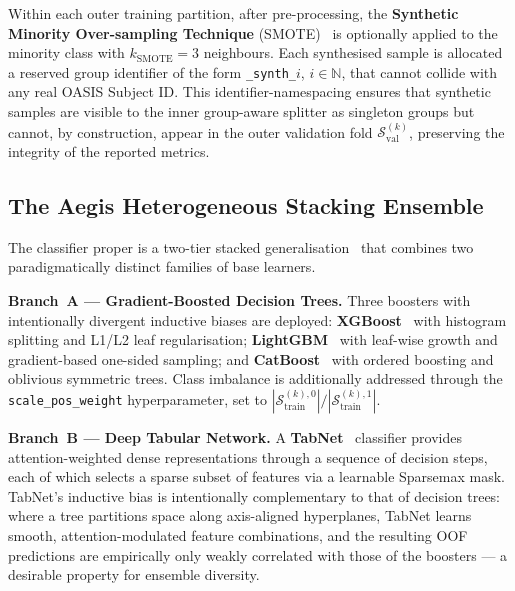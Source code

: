 Within each outer training partition, after pre-processing, the \textbf{Synthetic Minority Over-sampling Technique} (SMOTE)~\cite{chawla2002smote} is optionally applied to the minority class with $k_{\mathrm{SMOTE}} = 3$ neighbours. Each synthesised sample is allocated a reserved group identifier of the form \texttt{\_synth\_$i$}, $i \in \mathbb{N}$, that cannot collide with any real OASIS Subject ID. This identifier-namespacing ensures that synthetic samples are visible to the inner group-aware splitter as singleton groups but cannot, by construction, appear in the outer validation fold $\mathcal{S}_\mathrm{val}^{(k)}$, preserving the integrity of the reported metrics.

\subsection{The Aegis Heterogeneous Stacking Ensemble}
\label{subsec:ensemble}

The classifier proper is a two-tier stacked generalisation~\cite{wolpert1992} that combines two paradigmatically distinct families of base learners.

\textbf{Branch~A --- Gradient-Boosted Decision Trees.} Three boosters with intentionally divergent inductive biases are deployed: \textbf{XGBoost}~\cite{chen2016xgboost} with histogram splitting and L1/L2 leaf regularisation; \textbf{LightGBM}~\cite{ke2017lightgbm} with leaf-wise growth and gradient-based one-sided sampling; and \textbf{CatBoost}~\cite{prokhorenkova2018catboost} with ordered boosting and oblivious symmetric trees. Class imbalance is additionally addressed through the \texttt{scale\_pos\_weight} hyperparameter, set to $|\mathcal{S}_\mathrm{train}^{(k),0}|\big/|\mathcal{S}_\mathrm{train}^{(k),1}|$.

\textbf{Branch~B --- Deep Tabular Network.} A \textbf{TabNet}~\cite{arik2021tabnet} classifier provides attention-weighted dense representations through a sequence of decision steps, each of which selects a sparse subset of features via a learnable Sparsemax mask. TabNet's inductive bias is intentionally complementary to that of decision trees: where a tree partitions space along axis-aligned hyperplanes, TabNet learns smooth, attention-modulated feature combinations, and the resulting OOF predictions are empirically only weakly correlated with those of the boosters --- a desirable property for ensemble diversity.

